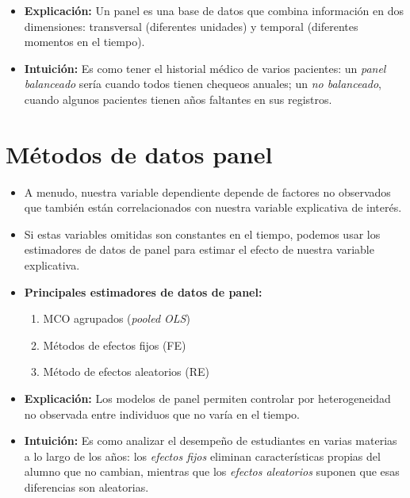 \documentclass[12pt]{article}
\begin{document}
\begin{itemize}
    \item \textbf{Explicación:} Un panel es una base de datos que combina información en dos dimensiones: transversal (diferentes unidades) y temporal (diferentes momentos en el tiempo).
    \item \textbf{Intuición:} Es como tener el historial médico de varios pacientes: 
    un \textit{panel balanceado} sería cuando todos tienen chequeos anuales; 
    un \textit{no balanceado}, cuando algunos pacientes tienen años faltantes en sus registros.
\end{itemize}

\section*{\noindent\textbf{Métodos de datos panel}}

\begin{itemize}
    \item A menudo, nuestra variable dependiente depende de factores no observados 
    que también están correlacionados con nuestra variable explicativa de interés.
    
    \item Si estas variables omitidas son constantes en el tiempo, 
    podemos usar los estimadores de datos de panel para estimar 
    el efecto de nuestra variable explicativa.
    
    \item \textbf{Principales estimadores de datos de panel:}
    \begin{enumerate}
        \item MCO agrupados (\textit{pooled OLS})
        \item Métodos de efectos fijos (FE)
        \item Método de efectos aleatorios (RE)
    \end{enumerate}
\end{itemize}

\begin{itemize}
    \item \textbf{Explicación:} Los modelos de panel permiten controlar por heterogeneidad no observada entre individuos que no varía en el tiempo.
    \item \textbf{Intuición:} Es como analizar el desempeño de estudiantes en varias materias a lo largo de los años: 
    los \textit{efectos fijos} eliminan características propias del alumno que no cambian, 
    mientras que los \textit{efectos aleatorios} suponen que esas diferencias son aleatorias.
\end{itemize}
\end{document}
